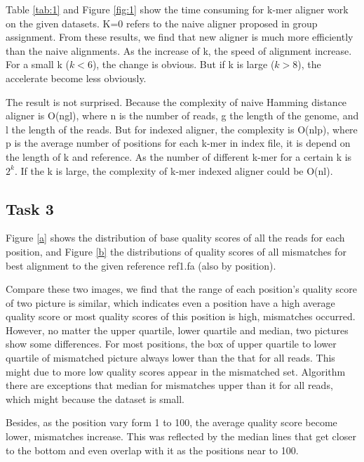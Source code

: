 \documentclass[a4paper]{article}
\begin{document}
Table \ref{tab:1} and Figure \ref{fig:1} show the time consuming for k-mer aligner work on the given datasets. K=0 refers to the naive aligner proposed in group assignment. From these results, we find that new aligner is much more efficiently than the naive alignments. As the increase of k, the speed of alignment increase. For a small k ($k<6$), the change is obvious. But if k is large ($k>8$), the accelerate become less obviously.

The result is not surprised. Because the  complexity of naive Hamming distance aligner is O(ngl), where n is the number of reads, g the length of the genome, and l the length of the reads. But for indexed aligner, the complexity is O(nlp), where p is the average number of positions for each k-mer in index file, it is depend on the length of k and reference. As the number of different k-mer for a certain k is $2^k$. If the k is large, the complexity of k-mer indexed aligner could be O(nl).

\subsection{Task 3}

Figure \ref{a}  shows the distribution of base quality scores of all the reads for each position, and Figure \ref{b} the distributions of quality scores of all mismatches for best alignment to the given reference ref1.fa  (also by position). 

Compare these two images, we find that the range of each position's quality score of two picture is similar, which indicates even a position have a high average quality score or most quality scores of this position is high, mismatches occurred.  However, no matter the upper quartile, lower quartile and median, two pictures show some differences. For most positions, the box of upper quartile to lower quartile of mismatched picture always lower than the that for all reads. This might due to more low quality scores appear in the mismatched set.  Algorithm there are exceptions that median for mismatches upper than it for all reads, which might because the dataset is small.

Besides, as the position vary form 1 to 100, the average quality score become lower, mismatches increase. This was reflected by the median lines that get closer to the bottom and even overlap with it as the positions near to 100.
\end{document}
